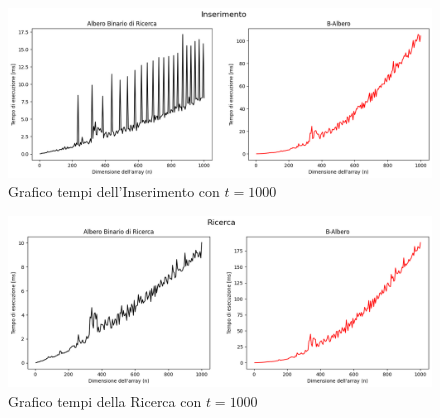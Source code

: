 \begin{figure}[H]
    \centering
    \includegraphics[width=\textwidth]{side-graphs/insert-ms-t1000.png}
    \caption{Grafico tempi dell'Inserimento con $t=1000$}
    \label{fig:sidegraphinserttimet1000}
\end{figure}
    
\begin{figure}[H]
    \centering
    \includegraphics[width=\textwidth]{side-graphs/search-ms-t1000.png}
    \caption{Grafico tempi della Ricerca con $t=1000$}    
    \label{fig:sidegraphsearchtimet1000}
\end{figure}

